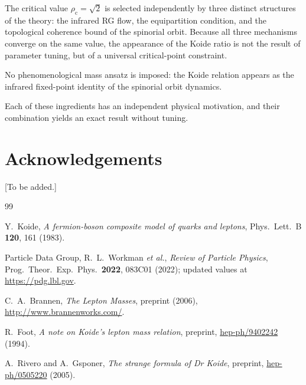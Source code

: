 \documentclass[12pt,a4paper]{article}
\theoremstyle{definition}
\begin{document}
The critical value $\rho_{\mathrm c}=\sqrt2$ is selected independently by
three distinct structures of the theory:
the infrared RG flow,
the equipartition condition,
and the topological coherence bound of the spinorial orbit.
Because all three mechanisms converge on the same value,
the appearance of the Koide ratio is not the result of parameter tuning,
but of a universal critical-point constraint.

No phenomenological mass ansatz is imposed:
the Koide relation appears as the infrared fixed-point identity
of the spinorial orbit dynamics.

Each of these ingredients has an independent physical motivation, and their combination
yields an exact result without tuning.

\section*{Acknowledgements}

[To be added.]

\begin{thebibliography}{99}

Y.~Koide,
\textit{A fermion-boson composite model of quarks and leptons},
Phys.\ Lett.\ B \textbf{120}, 161 (1983).

Particle Data Group, R.~L.~Workman \textit{et al.},
\textit{Review of Particle Physics},
Prog.\ Theor.\ Exp.\ Phys.\ \textbf{2022}, 083C01 (2022);
updated values at \url{https://pdg.lbl.gov}.

C.~A.~Brannen,
\textit{The Lepton Masses},
preprint (2006), \url{http://www.brannenworks.com/}.

R.~Foot,
\textit{A note on Koide's lepton mass relation},
preprint, \href{https://arxiv.org/abs/hep-ph/9402242}{hep-ph/9402242} (1994).

A.~Rivero and A.~Gsponer,
\textit{The strange formula of Dr Koide},
preprint, \href{https://arxiv.org/abs/hep-ph/0505220}{hep-ph/0505220} (2005).

\end{thebibliography}
\end{document}
